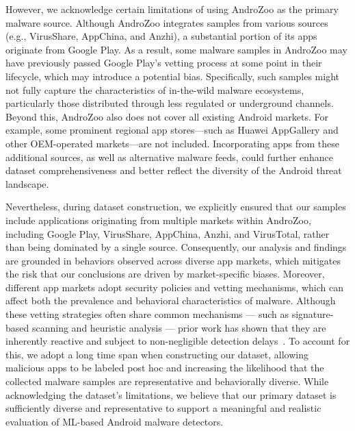 However, we acknowledge certain limitations of using AndroZoo as the primary malware source. 
Although AndroZoo integrates samples from various sources (e.g., VirusShare, AppChina, and Anzhi), a substantial portion of its apps originate from Google Play. 
As a result, some malware samples in AndroZoo may have previously passed Google Play's vetting process at some point in their lifecycle, which may introduce a potential bias. 
Specifically, such samples might not fully capture the characteristics of in-the-wild malware ecosystems, particularly those distributed through less regulated or underground channels.
Beyond this, AndroZoo also does not cover all existing Android markets. 
For example, some prominent regional app stores—such as Huawei AppGallery and other OEM-operated markets—are not included. 
Incorporating apps from these additional sources, as well as alternative malware feeds, could further enhance dataset comprehensiveness and better reflect the diversity of the Android threat landscape.


Nevertheless, during dataset construction, we explicitly ensured that our samples include applications originating from multiple markets within AndroZoo, including Google Play, VirusShare, AppChina, Anzhi, and VirusTotal, rather than being dominated by a single source.
Consequently, our analysis and findings are grounded in behaviors observed across diverse app markets, which mitigates the risk that our conclusions are driven by market-specific biases.
%
Moreover, different app markets adopt security policies and vetting mechanisms, which can affect both the prevalence and behavioral characteristics of malware.
Although these vetting strategies often share common mechanisms --- such as signature-based scanning and heuristic analysis --- prior work has shown that they are inherently reactive and subject to non-negligible detection delays~\cite{grace2012riskranker,zhou2012dissecting}.
To account for this, we adopt a long time span when constructing our dataset, allowing malicious apps to be labeled post hoc and increasing the likelihood that the collected malware samples are representative and behaviorally diverse.
While acknowledging the dataset's limitations, we believe that our primary dataset is sufficiently diverse and representative to support a meaningful and realistic evaluation of ML-based Android malware detectors.

